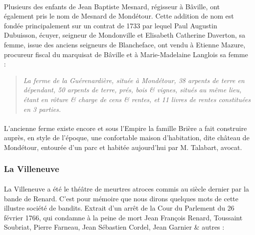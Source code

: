 \documentclass[../eBook.tex]{subfiles}
\begin{document}
      \paragraph{}Plusieurs des enfants de Jean Baptiste Mesnard, régisseur à Bâville, ont également pris le nom de Mesnard de Mondétour. Cette addition de nom est fondée principalement sur un contrat de 1733 par lequel Paul Augustin Dubuisson, écuyer, seigneur de Mondonville et Elisabeth Catherine Daverton, sa femme, issue des anciens seigneurs de Blancheface, ont vendu à Etienne Mazure, procureur fiscal du marquisat de Bâville et à Marie-Madelaine Langlois sa femme : \hrulefill
      \begin{quote}
        \og \textit{La ferme de la Guérenardière, située à Mondétour, 38 arpents de terre en dépendant, 50 arpents de terre, prés, bois \& vignes, situés au même lieu, étant en rôture \& charge de cens \& rentes, et 11 livres de rentes constituées en 3 parties.} \fg{}
      \end{quote}
      \paragraph{}L'ancienne ferme existe encore et sous l'Empire la famille Brière a fait construire auprès, en style de l'époque, une confortable maison d'habitation, dite château de Mondétour, entourée d'un parc et habitée aujourd'hui par M. Talabart, avocat.

    \subsubsection*{La Villeneuve}
      \paragraph{}La Villeneuve a été le théâtre de meurtres atroces commis au siècle dernier par la bande de Renard. C'est pour mémoire que nous dirons quelques mots de cette illustre société de bandits. Extrait d'un arrêt de la Cour du Parlement du 26 février 1766, qui condamne à la peine de mort Jean François Renard, Toussaint Soubriat, Pierre Farneau, Jean Sébastien Cordel, Jean Garnier \& autres :
\end{document}
